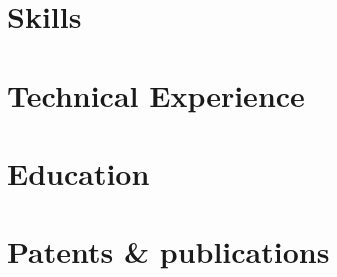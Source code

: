 \documentclass[letter,11pt]{article}
\begin{document}


\section{Skills}


\section{Technical Experience}


\newpage

\section{Education}



\section{Patents \& publications}

\end{document}
